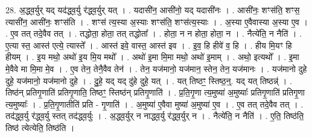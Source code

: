 \documentclass[17pt]{extarticle}
\begin{document}
28. अ॒द्ध्व॒र्युर् यद् यद॑द्ध्व॒र्यु र॑द्ध्व॒र्युर् यत् । . यदासी॑न॒ आसी॑नो॒ यद् यदासी॑नः । . आसी॑नः॒ शꣳस॑ति॒ शꣳस॒ त्यासी॑न॒ आसी॑नः॒ शꣳस॑ति । . शꣳस॑ त्य॒स्या अ॒स्याः शꣳस॑ति॒ शꣳस॑त्य॒स्याः । . अ॒स्या ए॒वैवास्या अ॒स्या ए॒व । . ए॒व तत् तदे॒वैव तत् । . तद्धोता॒ होता॒ तत् तद्धोता᳚ । . होता॒ न न होता॒ होता॒ न । . नैत्ये॑ति॒ न नैति॑ । . ए॒त्या स्त॒ आस्त॑ एत्ये॒ त्यास्ते᳚ । . आस्त॑ इवे॒ वास्त॒ आस्त॑ इव । . इ॒व॒ हि हीवे॑ व॒ हि । . हीय मि॒यꣳ हि हीयम् । . इ॒य मथो॒ अथो॑ इ॒य मि॒य मथो᳚ । . अथो॑ इ॒मा मि॒मा मथो॒ अथो॑ इ॒माम् । . अथो॒ इत्यथो᳚ । . इ॒मा मे॒वैवे मा मि॒मा मे॒व । . ए॒व तेन॒ तेनै॒वैव तेन॑ । . तेन॒ यज॑मानो॒ यज॑मान॒ स्तेन॒ तेन॒ यज॑मानः । . यज॑मानो दुहे दुहे॒ यज॑मानो॒ यज॑मानो दुहे । . दु॒हे॒ यद् यद् दु॑हे दुहे॒ यत् । . यत् तिष्ठꣳ॒॒ स्तिष्ठ॒न्॒. यद् यत् तिष्ठन्न्॑ । . तिष्ठ॑न् प्रतिगृ॒णाति॑ प्रतिगृ॒णाति॒ तिष्ठꣳ॒॒ स्तिष्ठ॑न् प्रतिगृ॒णाति॑ । . प्र॒ति॒गृ॒णा त्य॒मुष्या॑ अ॒मुष्याः᳚ प्रतिगृ॒णाति॑ प्रतिगृ॒णा त्य॒मुष्याः᳚ । . प्र॒ति॒गृ॒णातीति॑ प्रति - गृ॒णाति॑ । . अ॒मुष्या॑ ए॒वैवा मुष्या॑ अ॒मुष्या॑ ए॒व । . ए॒व तत् तदे॒वैव तत् । . तद॑द्ध्व॒र्यु र॑द्ध्व॒र्यु स्तत् तद॑द्ध्व॒र्युः । . अ॒द्ध्व॒र्युर् न नाद्ध्व॒र्यु र॑द्ध्व॒र्युर् न । . नैत्ये॑ति॒ न नैति॑ । . ए॒ति॒ तिष्ठ॑ति॒ तिष्ठ॑ त्येत्येति॒ तिष्ठ॑ति । \newline
\end{document}
